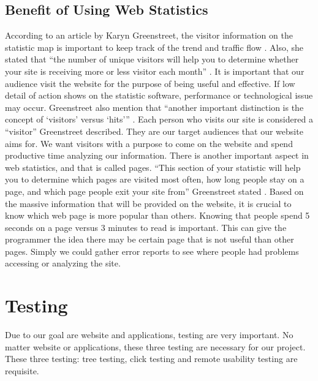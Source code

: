 \documentclass[letterpaper,10pt, draftclsnofoot,onecolumn]{IEEEtran}
\begin{document}
{{{{{{{{{{{{{{{{{\subsection[Benefit of Using Web Statistics]{\color{black}
Benefit of Using Web Statistics}
{\color{black}\normalsize\noindent
{According to an article by Karyn Greenstreet, the visitor information on the statistic map is important to keep track of the trend and traffic flow \cite{IEEEexample:article11}.
Also, she stated that “the number of unique visitors will help you to determine whether your site is receiving more or less visitor each month” \cite{IEEEexample:article11}.
It is important that our audience visit the website for the purpose of being useful and effective.
If low detail of action shows on the statistic software, performance or technological issue may occur. 
Greenstreet also mention that “another important distinction is the concept of ‘visitors’ versus ‘hits’” \cite{IEEEexample:article11}.
Each person who visits our site is considered a “visitor” Greenstreet described.
They are our target audiences that our website aims for. 
We want visitors with a purpose to come on the website and spend productive time analyzing our information. 
There is another important aspect in web statistics, and that is called pages. 
“This section of your statistic will help you to determine which pages are visited most often, how long people stay on a page, and which page people exit your site from” Greenstreet stated \cite{IEEEexample:article11}.
Based on the massive information that will be provided on the website, it is crucial to know which web page is more popular than others.
Knowing that people spend 5 seconds on a page versus 3 minutes to read is important. 
This can give the programmer the idea there may be certain page that is not useful than other pages. 
Simply we could gather error reports to see where people had problems accessing or analyzing the site.  
}

\section[Testing]{\color{black}
Testing}
\noindent Due to our goal are website and applications, testing are very important. No matter website or applications, these three testing are necessary for our project. These three testing: tree testing, click testing and remote usability testing are requisite. 

}}}}}}}}}}}}}}}}}}
\end{document}
